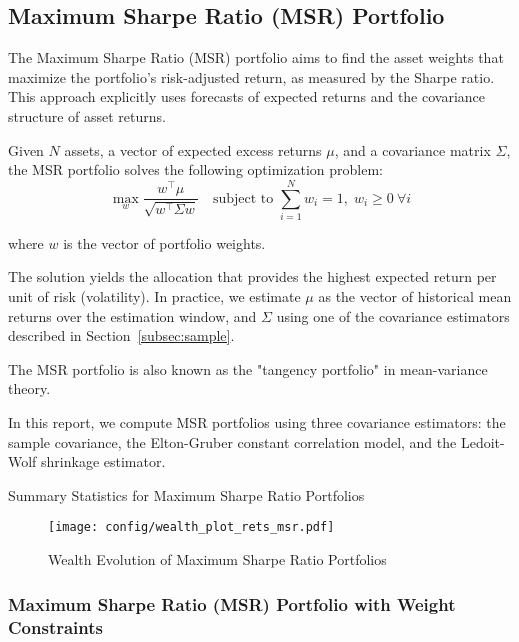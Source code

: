 \documentclass{article}
\begin{document}
\newpage
\subsection{Maximum Sharpe Ratio (MSR) Portfolio}

The Maximum Sharpe Ratio (MSR) portfolio aims to find the asset weights that maximize the portfolio's risk-adjusted return, as measured by the Sharpe ratio. This approach explicitly uses forecasts of expected returns and the covariance structure of asset returns.

Given $N$ assets, a vector of expected excess returns $\mu$, and a covariance matrix $\Sigma$, the MSR portfolio solves the following optimization problem:
\[
\max_{w} \frac{w^\top \mu}{\sqrt{w^\top \Sigma w}}
\quad \text{subject to } \sum_{i=1}^N w_i = 1, \; w_i \geq 0 \ \forall i
\]

where $w$ is the vector of portfolio weights.

The solution yields the allocation that provides the highest expected return per unit of risk (volatility). In practice, we estimate $\mu$ as the vector of historical mean returns over the estimation window, and $\Sigma$ using one of the covariance estimators described in Section~\ref{subsec:sample}.

The MSR portfolio is also known as the "tangency portfolio" in mean-variance theory.

In this report, we compute MSR portfolios using three covariance estimators: the sample covariance, the Elton-Gruber constant correlation model, and the Ledoit-Wolf shrinkage estimator.

\begin{table}[htbp]
\centering
\caption{Summary Statistics for Maximum Sharpe Ratio Portfolios}
\label{tab:stats_msr}
\begin{adjustbox}{max width=\textwidth}
    
\end{adjustbox}
\end{table}


\begin{figure}[htbp]
    \centering
    \texttt{[image: config/wealth\_plot\_rets\_msr.pdf]}
    \caption{Wealth Evolution of Maximum Sharpe Ratio Portfolios}
    \label{fig:wealth_msr}
\end{figure}

\subsubsection{Maximum Sharpe Ratio (MSR) Portfolio with Weight Constraints}
\end{document}

